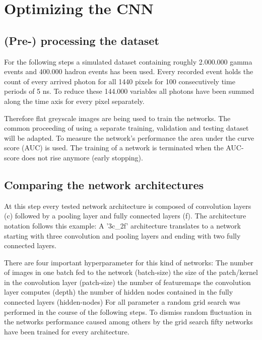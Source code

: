 \chapter{Optimizing the CNN}\label{make}

\section{(Pre-) processing the dataset}
For the following steps a simulated dataset containing roughly 2.000.000 gamma events and 400.000 hadron events has been used.
Every recorded event holds the count of every arrived photon for all 1440 pixels for 100 consecutively time periods of 5 ns.
To reduce these 144.000 variables all photons have been summed along the time axis for every pixel separately.

Therefore flat greyscale images are being used to train the networks.
The common proceeding of using a separate training, validation and testing dataset will be adapted.
To measure the network's performance the area under the curve score (AUC) is used.
The training of a network is terminated when the AUC-score does not rise anymore (early stopping).


\section{Comparing the network architectures}
At this step every tested network architecture is composed of convolution layers (c)
followed by a pooling layer and fully connected layers (f).
The architecture notation follows this example: A '3c\_2f' architecture translates to a network
starting with three convolution and pooling layers and ending with two fully connected layers.

There are four important hyperparameter for this kind of networks:
The number of images in one batch fed to the network (batch-size)
the size of the patch/kernel in the convolution layer (patch-size)
the number of featuremaps the convolution layer computes (depth)
the number of hidden nodes contained in the fully connected layers (hidden-nodes)
For all parameter a random grid search was performed in the course of the following steps.
To dismiss random fluctuation in the networks performance caused among others by the grid search
fifty networks have been trained for every architecture.

